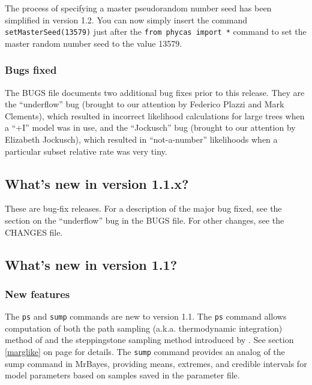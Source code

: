 \documentclass[10pt]{article}
\newcommand{\code}[1]{{\tt #1}}					%
\newcommand{\cmd}[1]{{\tt \small #1}\index{#1}}	%
\begin{document}
The process of specifying a master pseudorandom number seed has been simplified in version 1.2. You can now simply insert the command \code{setMasterSeed(13579)} just after the \code{from phycas import *} command to set the master random number seed to the value 13579.

\subsubsection{Bugs fixed}
The BUGS file documents two additional bug fixes prior to this release. They are the ``underflow'' bug (brought to our attention by Federico Plazzi and Mark Clements), which resulted in incorrect likelihood calculations for large trees when a ``+I'' model was in use, and the ``Jockusch'' bug (brought to our attention by Elizabeth Jockusch), which resulted in ``not-a-number'' likelihoods when a particular subset relative rate was very tiny.

\subsection{What's new in version 1.1.x?} %
These are bug-fix releases. For a description of the major bug fixed, see the section on the ``underflow'' bug in the BUGS file. For other changes, see the CHANGES file.

\subsection{What's new in version 1.1?} %
\subsubsection{New features}
The \cmd{ps} and \cmd{sump} commands are new to version 1.1. The \cmd{ps} command allows computation of both the path sampling (a.k.a. thermodynamic integration) method of \citet{LartillotPhillippe2006} and the steppingstone sampling method introduced by \citet{XieLewisFanKuoChen2010}. See section \ref{marglike} on page \pageref{marglike} for details. The \cmd{sump} command provides an analog of the sump command in MrBayes, providing means, extremes, and credible intervals for model parameters based on samples saved in the parameter file.
\end{document}
